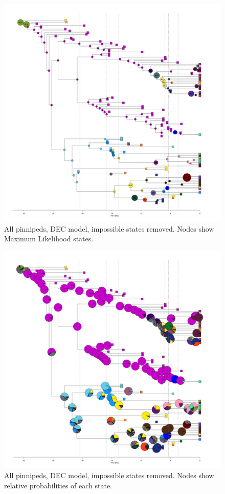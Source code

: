 \documentclass[a4paper, 12pt]{article}
\begin{document}
\begin{figure}[H]
 \centering
  \includegraphics[width = \linewidth]{figures/all-pinnipeds-DEC-impossible-MLstates.png}
  \caption{All pinnipeds, DEC model, impossible states removed. Nodes show Maximum Likelihood states.}
  \label{fig-all-dec-ml}
\end{figure} 

\begin{figure}[H]
 \centering
  \includegraphics[width = \linewidth]{figures/all-pinnipeds-DEC-impossible-pies.png}
  \caption{All pinnipeds, DEC model, impossible states removed. Nodes show relative probabilities of each state.}
  \label{fig-all-dec-pie}
\end{figure} 
\end{document}
